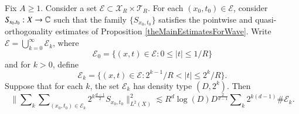 \begin{prop} \label{L2DensityProposition}
    Fix $A \geq 1$. Consider a set $\mathcal{E} \subset \mathcal{X}_R \times \mathcal{T}_R$. For each $(x_0,t_0) \in \mathcal{E}$, consider $S\!_{x_0,t_0}: X \to \operatorname{\mathbb{C}}$ such that the family $\{ S\!_{x_0,t_0} \}$ satisfies the pointwise and quasi-orthogonality estimates of Proposition \ref{theMainEstimatesForWave}. Write $\mathcal{E} = \bigcup_{k = 0}^\infty \mathcal{E}_k$, where
    \[ \mathcal{E}_0 = \{ (x,t) \in \mathcal{E}: 0 \leq |t| \leq 1/R \} \]
    and for $k > 0$, define
    \[ \mathcal{E}_k = \{ (x,t) \in \mathcal{E}: 2^{k-1} / R < |t| \leq 2^k / R \}. \]
    Suppose that for each $k$, the set $\mathcal{E}_k$ has density type $(D,2^{k})$.
    Then
    \[ \Big\| \sum\nolimits_k \sum\nolimits_{(x_0,t_0) \in \mathcal{E}_k} 2^{k \frac{d-1}{2}} {S\!}_{x_0,t_0} \Big\|_{L^2(X)}^2 \lesssim R^d \log(D) D^{\frac{2}{d-1}} \sum\nolimits_k 2^{k(d-1)} \# \mathcal{E}_k. \]
\end{prop}


